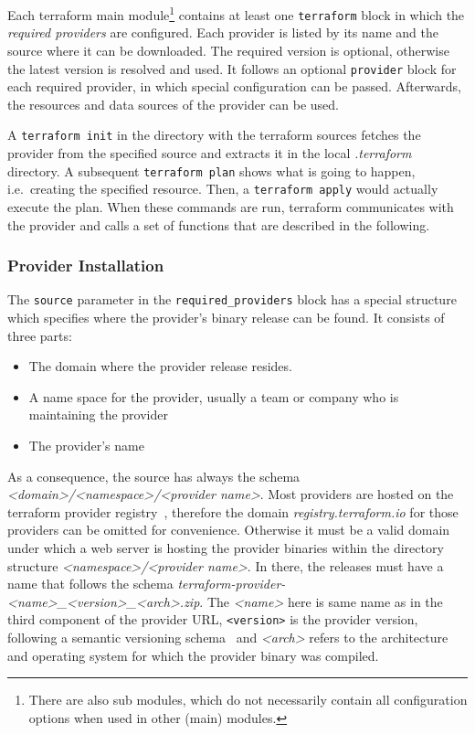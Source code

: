 \documentclass[paper=a4,11pt,numbers=noenddot]{article}
\begin{document}
Each terraform main module\footnote{There are also sub modules, which do not necessarily contain all configuration options when used in other (main) modules.} contains at least one \verb'terraform' block in which the \emph{required providers} are configured. Each provider is listed by its name and the source where it can be downloaded. The required version is optional, otherwise the latest version is resolved and used. It follows an optional \verb'provider' block for each required provider, in which special configuration can be passed. Afterwards, the resources and data sources of the provider can be used.

A \verb'terraform init' in the directory with the terraform sources fetches the provider from the specified source and extracts it in the local \emph{.terraform} directory. A subsequent \verb'terraform plan' shows what is going to happen, i.e.\ creating the specified resource. Then, a \verb'terraform apply' would actually execute the plan. When these commands are run, terraform communicates with the provider and calls a set of functions that are described in the following.


\subsubsection{Provider Installation}
\label{subsubsec:prov-inst}

The \verb'source' parameter in the \verb'required_providers' block has a special structure which specifies where the provider's binary release can be found. It consists of three parts:

\begin{itemize}
\item The domain where the provider release resides.
\item A name space for the provider, usually a team or company who is maintaining the provider
\item The provider's name
\end{itemize}

As a consequence, the source has always the schema \emph{<domain>/<namespace>/<provider name>}. Most providers are hosted on the terraform provider registry~\cite{noauthor_terraform_registry_nodate}, therefore the domain \emph{registry.terraform.io} for those providers can be omitted for convenience. Otherwise it must be a valid domain under which a web server is hosting the provider binaries within the directory structure \emph{<namespace>/<provider name>}. In there, the releases must have a name that follows the schema \emph{terraform-provider-<name>\_<version>\_<arch>.zip}. The \emph{<name>} here is same name as in the third component of the provider URL, \verb'<version>' is the provider version, following a semantic versioning schema~\cite{preston-werner_semantic_versioning_nodate} and \emph{<arch>} refers to the architecture and operating system for which the provider binary was compiled.
\end{document}
